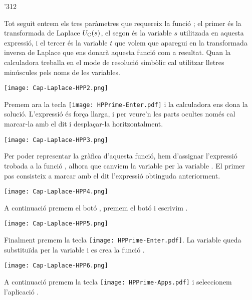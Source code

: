 \begin{exemple}[\CircuitLaplaceNul{}]
\begin{dingautolist}{'312}
         \item Tot seguit entrem els tres paràmetres que requereix la funció ; el primer és la transformada de Laplace  $U_\mathrm{C}(s)$, el segon és la variable $s$ utilitzada en aquesta expressió, i el tercer és la variable $t$ que volem que aparegui en la transformada inversa de Laplace que ens donarà aquesta funció com a resultat. Quan la calculadora treballa en el  mode de resolució simbòlic cal utilitzar lletres minúscules pels noms de les variables.

            \texttt{[image: Cap-Laplace-HPP2.png]}\vspace{5mm}

         \item Premem ara la tecla \texttt{[image: HPPrime-Enter.pdf]} i la calculadora ens dona la solució. L'expressió és força llarga, i per veure'n les parts ocultes només cal marcar-la amb el dit i desplaçar-la horitzontalment.

            \texttt{[image: Cap-Laplace-HPP3.png]}\vspace{5mm}

         \item Per  poder representar la gràfica d'aquesta funció, hem d'assignar l'expressió trobada a la  funció , alhora que canviem la variable  per la variable . El primer pas consisteix a marcar amb el dit l'expressió obtinguda anteriorment.

            \texttt{[image: Cap-Laplace-HPP4.png]}\vspace{5mm}

         \item A continuació premem el botó  , premem el botó  i  escrivim  .

             \texttt{[image: Cap-Laplace-HPP5.png]}\vspace{5mm}

         \item Finalment premem la tecla \texttt{[image: HPPrime-Enter.pdf]}. La variable  queda substituïda per la variable  i es crea la funció .

          \texttt{[image: Cap-Laplace-HPP6.png]}\vspace{5mm}


         \item A continuació premem  la tecla \texttt{[image: HPPrime-Apps.pdf]} i seleccionem  l'aplicació .


\end{dingautolist}
\end{exemple}
